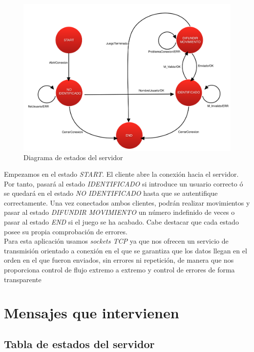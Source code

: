\begin{figure}[h]
	\centering
	\includegraphics[width=.8\textwidth]{img/1}
	\caption{Diagrama de estados del servidor}
\end{figure}
	

Empezamos en el estado \textit{START}. El cliente abre la conexión hacia el servidor. Por tanto, pasará al estado \textit{IDENTIFICADO} si introduce un usuario correcto ó se quedará en el estado \textit{NO IDENTIFICADO} hasta que se autentifique correctamente. Una vez conectados ambos clientes, podrán realizar movimientos y pasar al estado \textit{DIFUNDIR MOVIMIENTO} un número indefinido de veces o pasar al estado \textit{END} si el juego se ha acabado. Cabe destacar que cada estado posee su propia comprobación de errores. \\

Para esta aplicación usamos \textit{sockets TCP} ya que nos ofrecen un servicio de transmisión orientado a conexión en el que se garantiza que los datos llegan en el orden en el que fueron enviados, sin errores ni repetición, de manera que nos proporciona control de flujo extremo a extremo y control de errores de forma transparente
	












\newpage

\section{Mensajes que intervienen}

\subsection{Tabla de estados del servidor}

